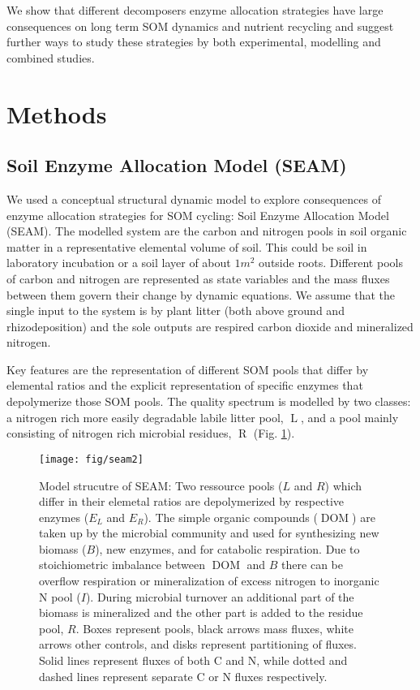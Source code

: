 We show that different decomposers enzyme allocation strategies have large
consequences on long term SOM dynamics and nutrient recycling and suggest
further ways to study these strategies by both experimental, modelling and
combined studies.

\section{Methods}
\subsection{Soil Enzyme Allocation Model (SEAM)}
We used a conceptual structural dynamic model to explore consequences of enzyme
allocation strategies for SOM cycling: Soil Enzyme Allocation Model (SEAM). The
modelled system are the carbon and nitrogen pools in soil organic matter in a
representative elemental volume of soil. This could be soil in laboratory
incubation or a soil layer of about $1 \unit{m}^2$ outside roots. Different
pools of carbon and nitrogen are represented as state variables and the mass
fluxes between them govern their change by dynamic equations. We assume that the
single input to the system is by plant litter (both above ground and
rhizodeposition) and the sole outputs are respired carbon dioxide and
mineralized nitrogen. 

Key features are the representation of different SOM pools that differ by
elemental ratios and the explicit representation of specific enzymes that
depolymerize those SOM pools. The quality spectrum is modelled by two
classes: a nitrogen rich more easily degradable labile litter pool,
$\operatorname{L}$, and a pool mainly consisting of nitrogen rich microbial
residues, $\operatorname{R}$ (Fig. \ref{fig:SEAM}).

\begin{figure}[t] \vspace*{2mm}
\label{fig:SEAM}
\begin{center}
\texttt{[image: fig/seam2]}
\end{center}
\caption{Model strucutre of SEAM: Two ressource pools ($L$ and $R$) which differ
in their elemetal ratios are
depolymerized by respective enzymes ($E_L$ and $E_R$). The simple organic
compounds ($\operatorname{DOM}$) are taken up
by the microbial community  and used for synthesizing
new biomass (${B}$), new enzymes, and for catabolic respiration. 
Due to stoichiometric imbalance between $\operatorname{DOM}$ and ${B}$
there can be overflow respiration or mineralization of excess nitrogen to
inorganic N pool ($I$).
During microbial turnover an additional part of the biomass is mineralized and the
other part is added to the residue pool, $R$. Boxes represent pools, black
arrows mass fluxes, white arrows other controls, and disks represent
partitioning of fluxes. Solid lines represent fluxes of both C and N, while
dotted and dashed lines represent separate C or N fluxes respectively.}
\end{figure}

